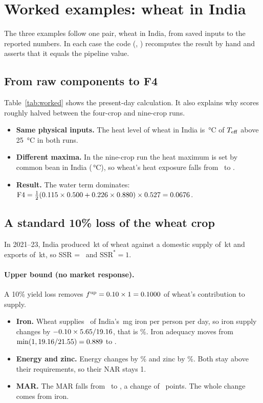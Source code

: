 \section{Worked examples: wheat in India}\label{sec:worked}
The three examples follow one pair, wheat in India, from saved inputs to the reported numbers. In each case the
code (, ) recomputes the result by hand and asserts that it
equals the pipeline value.

\subsection{From raw components to F4}
Table~\ref{tab:worked} shows the present-day calculation. It also explains why scores roughly halved between the
four-crop and nine-crop runs.
\begin{itemize}
\item \textbf{Same physical inputs.} The heat level of wheat in India is \exNineLheatc\,\si{\celsius} of $T_{\mathrm{eff}}$
above \SI{25}{\celsius} in both runs.
\item \textbf{Different maxima.} In the nine-crop run the heat maximum is set by common bean in India
(\exNinemaxLheat\,\si{\celsius}), so wheat's heat exposure falls from \exFourEheat\ to \exNineEheat.
\item \textbf{Result.} The water term dominates:
$\mathrm{F4} = \tfrac12(0.115\times0.500 + 0.226\times0.880)\times0.527 = 0.0676$.
\end{itemize}



\subsection{A standard 10\% loss of the wheat crop}
In 2021--23, India produced \wsWheatIndProd\,kt of wheat against a domestic supply of \wsWheatIndDom\,kt and
exports of \wsWheatIndExp\,kt, so SSR = \wsSSR\ and $\text{SSR}^{*}=1$.

\paragraph{Upper bound (no market response).} A 10\% yield loss removes $f^{\text{up}} = 0.10\times1 =
0.1000$ of wheat's contribution to supply.
\begin{itemize}
\item \textbf{Iron.} Wheat supplies \wsCIron\ of India's \wsBIron\,mg iron per person per day, so iron supply
changes by $-0.10\times5.65/19.16$, that is \wsDIron\%. Iron adequacy moves from
$\min(1, 19.16/21.55) = 0.889$ to \wsNARoneIron.
\item \textbf{Energy and zinc.} Energy changes by \wsDKcal\% and zinc by \wsDZinc\%. Both stay above their
requirements, so their NAR stays 1.
\item \textbf{MAR.} The MAR falls from \wsMARzero\ to \wsMARone, a change of \wsDMAR\ points. The whole change
comes from iron.
\end{itemize}


